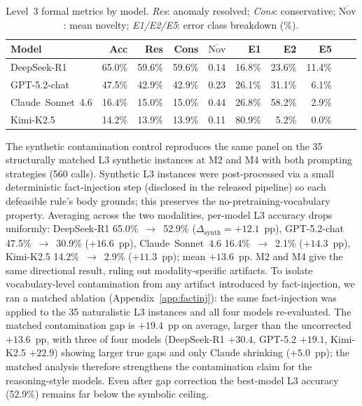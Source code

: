 \documentclass{article}
\theoremstyle{definition}
\newcommand{\Nov}{\mathrm{Nov}}
\begin{document}
\begin{table}[t]
\centering
\caption{Level~3 formal metrics by model. \emph{Res}: anomaly resolved; \emph{Cons}: conservative; $\overline{\Nov}$: mean novelty; \emph{E1/E2/E5}: error class breakdown (\%).}
\label{tab:level3_metrics}
\begin{tabular}{lrrrrrrrrr}
\toprule
Model & Acc & Res & Cons & $\overline{\Nov}$ & E1 & E2 & E5 \\
\midrule
DeepSeek-R1 & 65.0\% & 59.6\% & 59.6\% & 0.14 & 16.8\% & 23.6\% & 11.4\% \\
GPT-5.2-chat & 47.5\% & 42.9\% & 42.9\% & 0.23 & 26.1\% & 31.1\% & \phantom{0}6.1\% \\
Claude~Sonnet~4.6 & 16.4\% & 15.0\% & 15.0\% & 0.44 & 26.8\% & 58.2\% & \phantom{0}2.9\% \\
Kimi-K2.5 & 14.2\% & 13.9\% & 13.9\% & 0.11 & 80.9\% & \phantom{0}5.2\% & \phantom{0}0.0\% \\
\bottomrule
\end{tabular}
\end{table}

The synthetic contamination control reproduces the same panel on the 35 structurally matched L3 synthetic instances at M2 and M4 with both prompting strategies (560 calls). Synthetic L3 instances were post-processed via a small deterministic fact-injection step (disclosed in the released pipeline) so each defeasible rule's body grounds; this preserves the no-pretraining-vocabulary property. Averaging across the two modalities, per-model L3 accuracy drops uniformly: DeepSeek-R1 65.0\%~$\to$~52.9\% ($\Delta_{\mathrm{synth}} = +12.1$~pp), GPT-5.2-chat 47.5\%~$\to$~30.9\% ($+16.6$~pp), Claude~Sonnet~4.6 16.4\%~$\to$~2.1\% ($+14.3$~pp), Kimi-K2.5 14.2\%~$\to$~2.9\% ($+11.3$~pp); mean $+13.6$~pp. M2 and M4 give the same directional result, ruling out modality-specific artifacts. To isolate vocabulary-level contamination from any artifact introduced by fact-injection, we ran a matched ablation (Appendix~\ref{app:factinj}): the same fact-injection was applied to the 35 naturalistic L3 instances and all four models re-evaluated. The matched contamination gap is $+19.4$~pp on average, larger than the uncorrected $+13.6$~pp, with three of four models (DeepSeek-R1 $+30.4$, GPT-5.2 $+19.1$, Kimi-K2.5 $+22.9$) showing larger true gaps and only Claude shrinking ($+5.0$~pp); the matched analysis therefore strengthens the contamination claim for the reasoning-style models. Even after gap correction the best-model L3 accuracy (52.9\%) remains far below the symbolic ceiling.
\end{document}
